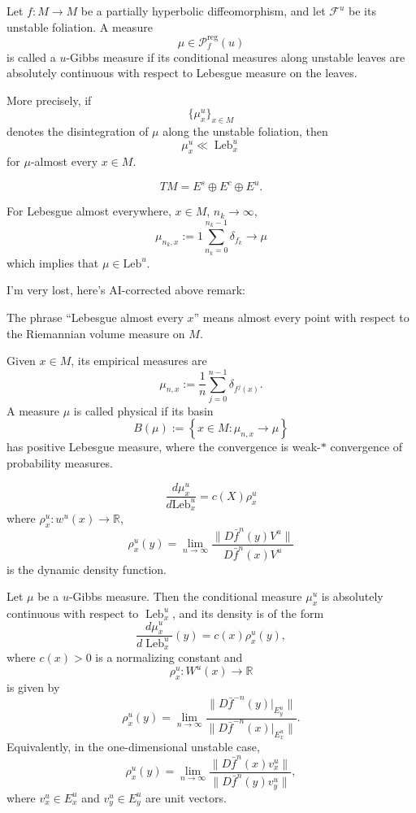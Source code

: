 \begin{definition}[AI]
\label{definition-u-gibbs-measure}
Let $f:M \to M$ be a partially hyperbolic
diffeomorphism, and let
$\mathcal F^u$ be its unstable foliation.
A measure
$$
\mu \in \mathcal P_f^{\operatorname{reg}}(u)
$$
is called a $u$-Gibbs measure if its
conditional measures along unstable leaves
are absolutely continuous with respect to
Lebesgue measure on the leaves.

More precisely, if
$$
\{\mu_x^u\}_{x \in M}
$$
denotes the disintegration of $\mu$ along
the unstable foliation, then
$$
\mu_x^u \ll \operatorname{Leb}_x^u
$$
for $\mu$-almost every $x \in M$.
\end{definition}

\begin{remark}
\label{remark-stable-directions-dyn}
$$
TM = E^s \oplus E^c \oplus E^u.
$$
\end{remark}

\begin{remark}
\label{remark-leb-ae-ai}
For Lebesgue almost everywhere,
$x \in M$, $n_k \to \infty$,
$$
\mu_{n_k,x}
:=
1 \sum_{n_k=0}^{n_k-1}
\delta_{f_k} \to \mu
$$
which implies that $\mu \in 
\text{Leb}^u$.
\end{remark}

\noindent
I'm very lost, here's AI-corrected
above remark:

\begin{remark}
\label{remark-lebesgue-ae}
The phrase ``Lebesgue almost every $x$''
means almost every point with respect to
the Riemannian volume measure on $M$.

Given $x \in M$, its empirical measures are
$$
\mu_{n,x}
:=
\frac{1}{n}
\sum_{j=0}^{n-1}
\delta_{f^j(x)}.
$$
A measure $\mu$ is called physical if its
basin
$$
B(\mu)
:=
\left\{
x \in M :
\mu_{n,x} \to \mu
\right\}
$$
has positive Lebesgue measure, where the
convergence is weak-$*$ convergence of
probability measures.
\end{remark}

\begin{lemma}
\label{lemma-ledrappier}
$$
\frac{d\mu^u_x}{
d\text{Leb}_x^u}
=c(X)\rho_x^u
$$
where $\rho_x^u:w^u(x)\to \mathbb{R}$,
$$
\rho_x^u(y)
=
\lim_{n \to \infty} 
\frac{\|D\bar{f}^n(y)V^u\|}{
D\bar{f}^n(x) V^u}
$$
is the dynamic density function.
\end{lemma}
\begin{lemma}
\label{lemma-ledrappier-density}
Let $\mu$ be a $u$-Gibbs measure. Then the
conditional measure $\mu_x^u$ is absolutely
continuous with respect to $\operatorname{Leb}_x^u$,
and its density is of the form
$$
\frac{d\mu_x^u}{d\operatorname{Leb}_x^u}(y)
=
c(x)\rho_x^u(y),
$$
where $c(x)>0$ is a normalizing constant and
$$
\rho_x^u:W^u(x)\to \mathbb R
$$
is given by
$$
\rho_x^u(y)
=
\lim_{n\to\infty}
\frac{
\|D\bar f^{-n}(y)|_{E_y^u}\|
}{
\|D\bar f^{-n}(x)|_{E_x^u}\|
}.
$$
Equivalently, in the one-dimensional unstable
case,
$$
\rho_x^u(y)
=
\lim_{n\to\infty}
\frac{
\|D\bar f^n(x)v_x^u\|
}{
\|D\bar f^n(y)v_y^u\|
},
$$
where $v_x^u\in E_x^u$ and $v_y^u\in E_y^u$
are unit vectors.
\end{lemma}

